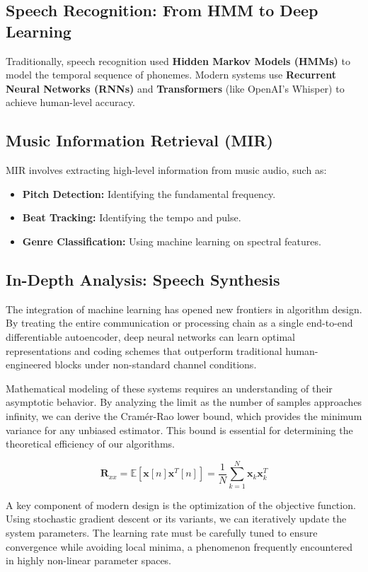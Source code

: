 \subsection{Speech Recognition: From HMM to Deep Learning}
Traditionally, speech recognition used \textbf{Hidden Markov Models (HMMs)} to model the temporal sequence of phonemes. Modern systems use \textbf{Recurrent Neural Networks (RNNs)} and \textbf{Transformers} (like OpenAI's Whisper) to achieve human-level accuracy.

\subsection{Music Information Retrieval (MIR)}
MIR involves extracting high-level information from music audio, such as:
\begin{itemize}
    \item \textbf{Pitch Detection:} Identifying the fundamental frequency.
    \item \textbf{Beat Tracking:} Identifying the tempo and pulse.
    \item \textbf{Genre Classification:} Using machine learning on spectral features.
\end{itemize}

\subsection{In-Depth Analysis: Speech Synthesis}
The integration of machine learning has opened new frontiers in algorithm design. By treating the entire communication or processing chain as a single end-to-end differentiable autoencoder, deep neural networks can learn optimal representations and coding schemes that outperform traditional human-engineered blocks under non-standard channel conditions.

Mathematical modeling of these systems requires an understanding of their asymptotic behavior. By analyzing the limit as the number of samples approaches infinity, we can derive the Cramér-Rao lower bound, which provides the minimum variance for any unbiased estimator. This bound is essential for determining the theoretical efficiency of our algorithms.

\begin{equation}
    \mathbf{R}_{xx} = \mathbb{E}[\mathbf{x}[n]\mathbf{x}^T[n]] = \frac{1}{N} \sum_{k=1}^{N} \mathbf{x}_k \mathbf{x}_k^T
\end{equation}

A key component of modern design is the optimization of the objective function. Using stochastic gradient descent or its variants, we can iteratively update the system parameters. The learning rate must be carefully tuned to ensure convergence while avoiding local minima, a phenomenon frequently encountered in highly non-linear parameter spaces.

